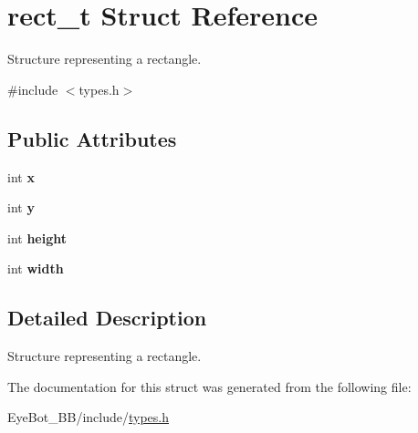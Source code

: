 \hypertarget{structrect__t}{\section{rect\-\_\-t \-Struct \-Reference}
\label{structrect__t}
}


\-Structure representing a rectangle.  




{\ttfamily \#include $<$types.\-h$>$}

\subsection*{\-Public \-Attributes}
\begin{DoxyCompactItemize}
\item 
\hypertarget{structrect__t_aac9f3f28f20b5ed45f64fac971269dc3}{int {\bfseries x}}\label{structrect__t_aac9f3f28f20b5ed45f64fac971269dc3}

\item 
\hypertarget{structrect__t_a0683ba02d080cdcaeacbf0ab28c73083}{int {\bfseries y}}\label{structrect__t_a0683ba02d080cdcaeacbf0ab28c73083}

\item 
\hypertarget{structrect__t_a6757e6a1de994e1312a7317516c51633}{int {\bfseries height}}\label{structrect__t_a6757e6a1de994e1312a7317516c51633}

\item 
\hypertarget{structrect__t_ac2cdd772626440d863597b9d38ef1e96}{int {\bfseries width}}\label{structrect__t_ac2cdd772626440d863597b9d38ef1e96}

\end{DoxyCompactItemize}


\subsection{\-Detailed \-Description}
\-Structure representing a rectangle. 

\-The documentation for this struct was generated from the following file\-:\begin{DoxyCompactItemize}
\item 
\-Eye\-Bot\-\_\-\-B\-B/include/\hyperlink{types_8h}{types.\-h}\end{DoxyCompactItemize}

